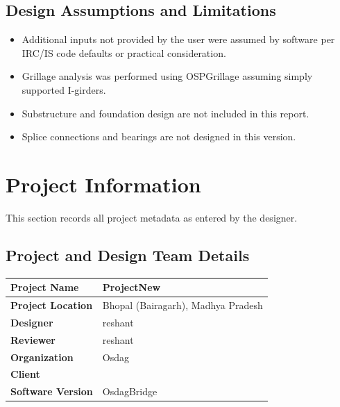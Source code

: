 \documentclass[12pt,a4paper]{report}
\numberwithin{table}{chapter}
\numberwithin{figure}{chapter}
\begin{document}
\section*{Design Assumptions and Limitations}
\label{sec:assumptions}

\begin{itemize}
\item Additional inputs not provided by the user were assumed by software per IRC/IS code defaults or practical consideration.
\item Grillage analysis was performed using OSPGrillage assuming simply supported I-girders.
\item Substructure and foundation design are not included in this report.
\item Splice connections and bearings are not designed in this version.
\end{itemize}

\titleformat{\chapter}[block]{\normalfont\Large\bfseries\centering}{\thechapter}{1em}{}
\titlespacing*{\chapter}{0pt}{-30pt}{10pt}


\chapter{Project Information}

This section records all project metadata as entered by the designer.

\section{Project and Design Team Details}
\label{sec:project-details}

\begin{tabular}{|L{5.5cm}|L{8.5cm}|}
\hline
\textbf{Project Name} & ProjectNew \\
\hline
\textbf{Project Location} & Bhopal (Bairagarh), Madhya Pradesh \\
\hline
\textbf{Designer} & reshant \\
\hline
\textbf{Reviewer} & reshant \\
\hline
\textbf{Organization} & Osdag \\
\hline
\textbf{Client} &  \\
\hline
\textbf{Software Version} & OsdagBridge \\
\hline
\end{tabular}
\end{document}
